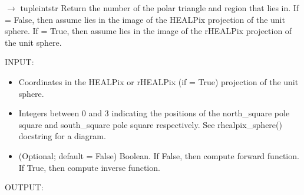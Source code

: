 \documentclass[a4paper,12ptopenany,oneside,english]{sphinxmanual}
\begin{document}
\begin{fulllineitems}
\label{\detokenize{pj_rhealpix:rhealpixdggs.pj_rhealpix.triangle}}
\pysigstartsignatures
\pysiglinewithargsret
{}
{\sphinxparamcomma {}\sphinxparamcomma {}\sphinxparamcomma {}\sphinxparamcomma {}}
{{ $\rightarrow$ tuple\DUrole{p}{{[}}intstr\DUrole{p}{{]}}}}
\pysigstopsignatures
\sphinxAtStartPar
Return the number of the polar triangle and region that  lies in.
If  = False, then assume  lies in the image of the HEALPix
projection of the unit sphere.
If  = True, then assume  lies in the image of the
\sphinxhyphen{}rHEALPix projection of the unit sphere.

\sphinxAtStartPar
INPUT:
\begin{itemize}
\item {} 
\sphinxAtStartPar
{} \sphinxhyphen{} Coordinates in the HEALPix or rHEALPix (if  = True)
projection of the unit sphere.

\item {} 
\sphinxAtStartPar
{} \sphinxhyphen{} Integers between 0 and 3 indicating the
positions of the north\_square pole square and south\_square pole square
respectively.
See rhealpix\_sphere() docstring for a diagram.

\item {} 
\sphinxAtStartPar
{} \sphinxhyphen{} (Optional; default = False) Boolean. If False, then compute
forward function. If True, then compute inverse function.

\end{itemize}

\sphinxAtStartPar
OUTPUT:


\end{fulllineitems}
\end{document}
